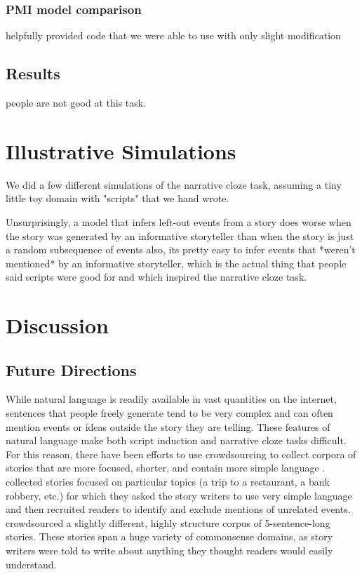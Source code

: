 \documentclass[10pt,a4paper]{article}
\newcommand{\todo}[1]{{\color{red}#1}}
\begin{document}
\subsubsection{PMI model comparison}

\todo{
 helpfully provided code that we were able to use with only slight modification
}

\subsection{Results}

\todo{people are not good at this task.}

\section{Illustrative Simulations}

\todo{
We did a few different simulations of the narrative cloze task, assuming a tiny little toy domain with "scripts" that we hand wrote.

Unsurprisingly,
a model that infers left-out events from a story does worse when the story was generated by an informative storyteller than when the story is just a random subsequence of events
also, its pretty easy to infer events that *weren't mentioned* by an informative storyteller, which is the actual thing that people said scripts were good for and which inspired the narrative cloze task.
}

\section{Discussion}

\subsection{Future Directions}

While natural language is readily available in vast quantities on the internet, sentences that people freely generate tend to be very complex and can often mention events or ideas outside the story they are telling. These features of natural language make both script induction and narrative cloze tasks difficult. For this reason, there have been efforts to use crowdsourcing to collect corpora of stories that are more focused, shorter, and contain more simple language .  collected stories focused on particular topics (a trip to a restaurant, a bank robbery, etc.) for which they asked the story writers to use very simple language and then recruited readers to identify and exclude mentions of unrelated events.  crowdsourced a slightly different, highly structure corpus of 5-sentence-long stories. These stories span a huge variety of commonsense domains, as story writers were told to write about anything they thought readers would easily understand.
\end{document}
